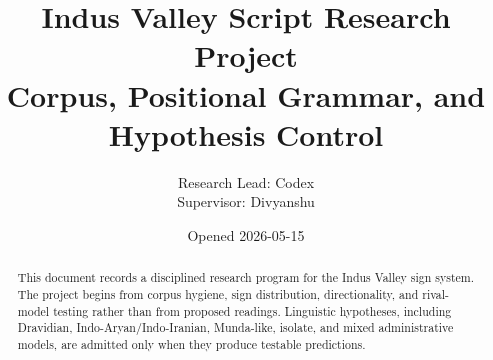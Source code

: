 \documentclass[11pt,a4paper]{article}
\title{Indus Valley Script Research Project\\
\large Corpus, Positional Grammar, and Hypothesis Control}
\author{Research Lead: Codex\\Supervisor: Divyanshu}
\date{Opened 2026-05-15}
\begin{document}
\maketitle

\begin{abstract}
This document records a disciplined research program for the Indus Valley sign system. The project begins from corpus hygiene, sign distribution, directionality, and rival-model testing rather than from proposed readings. Linguistic hypotheses, including Dravidian, Indo-Aryan/Indo-Iranian, Munda-like, isolate, and mixed administrative models, are admitted only when they produce testable predictions.
\end{abstract}

\tableofcontents
\newpage































\end{document}
